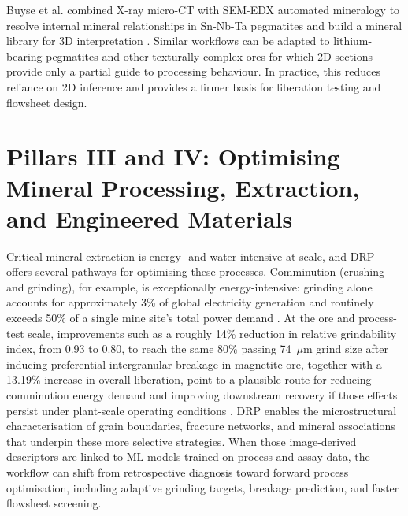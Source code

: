 \documentclass[12pt,a4paper]{article}
\begin{document}
\begin{tcolorbox}[enhanced, colback=blue!3!white, colframe=blue!35!black, title=\textbf{Illustrative Case Study: Correlative Imaging for Complex Pegmatites}, fonttitle=\bfseries, arc=1.5mm, boxrule=0.8pt]
Buyse et al. combined X-ray micro-CT with SEM-EDX automated mineralogy to resolve internal mineral relationships in Sn-Nb-Ta pegmatites and build a mineral library for 3D interpretation \cite{buyse_correlative_2023}. Similar workflows can be adapted to lithium-bearing pegmatites and other texturally complex ores for which 2D sections provide only a partial guide to processing behaviour. In practice, this reduces reliance on 2D inference and provides a firmer basis for liberation testing and flowsheet design.
\end{tcolorbox}

\section{Pillars III and IV: Optimising Mineral Processing, Extraction, and Engineered Materials}
Critical mineral extraction is energy- and water-intensive at scale, and DRP offers several pathways for optimising these processes. Comminution (crushing and grinding), for example, is exceptionally energy-intensive: grinding alone accounts for approximately 3\% of global electricity generation and routinely exceeds 50\% of a single mine site's total power demand \cite{norgate_comminution_2010}. At the ore and process-test scale, improvements such as a roughly 14\% reduction in relative grindability index, from 0.93 to 0.80, to reach the same 80\% passing 74~$\mu$m grind size after inducing preferential intergranular breakage in magnetite ore, together with a 13.19\% increase in overall liberation, point to a plausible route for reducing comminution energy demand and improving downstream recovery if those effects persist under plant-scale operating conditions \cite{kyle_processing_2015, gao_hvep_2017}. DRP enables the microstructural characterisation of grain boundaries, fracture networks, and mineral associations that underpin these more selective strategies. When those image-derived descriptors are linked to ML models trained on process and assay data, the workflow can shift from retrospective diagnosis toward forward process optimisation, including adaptive grinding targets, breakage prediction, and faster flowsheet screening.
\end{document}
